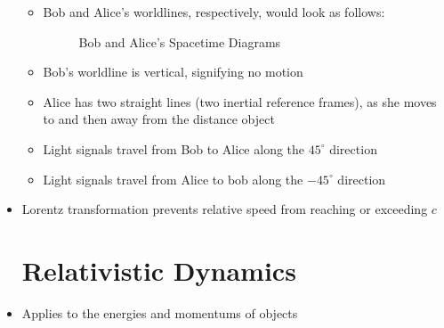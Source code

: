 \begin{itemize}
\begin{itemize}
      \item Bob and Alice's worldlines, respectively, would look as follows:

        \begin{figure}[h!]
          \centering
          
          \caption{Bob and Alice's Spacetime Diagrams}
          \label{fig:5}
        \end{figure}

      \item Bob's worldline is vertical, signifying no motion

      \item Alice has two straight lines (two inertial reference frames), as she moves to and then away from the distance object

      \item Light signals travel from Bob to Alice along the $45^{\circ}$ direction

      \item Light signals travel from Alice to bob along the $-45^{\circ}$ direction

    \end{itemize}

  \item Lorentz transformation prevents relative speed from reaching or exceeding $c$

    \section{Relativistic Dynamics}

  \item Applies to the energies and momentums of objects

\end{itemize}




